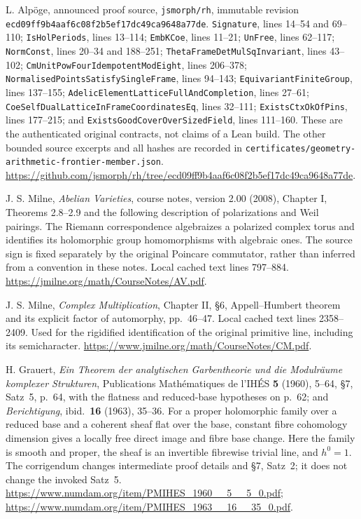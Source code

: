 L. Alp\"oge, announced proof source, \texttt{jsmorph/rh},
immutable revision \texttt{ecd09ff9b4aaf6c08f2b5ef17dc49ca9648a77de}.
\texttt{Signature}, lines 14--54 and 69--110;
\texttt{IsHolPeriods}, lines 13--114;
\texttt{EmbKCoe}, lines 11--21;
\texttt{UnFree}, lines 62--117;
\texttt{NormConst}, lines 20--34 and 188--251;
\texttt{ThetaFrameDetMulSqInvariant}, lines 43--102;
\texttt{CmUnitPowFourIdempotentModEight}, lines 206--378;
\texttt{NormalisedPointsSatisfySingleFrame}, lines 94--143;
\texttt{EquivariantFiniteGroup}, lines 137--155;
\texttt{AdelicElementLatticeFullAndCompletion}, lines 27--61;
\texttt{CoeSelfDualLatticeInFrameCoordinatesEq}, lines 32--111;
\texttt{ExistsCtxOkOfPins}, lines 177--215;
and \texttt{ExistsGoodCoverOverSizedField}, lines 111--160.
These are the authenticated original contracts, not claims of a
Lean build.  The other bounded source excerpts and all hashes
are recorded in
\texttt{certificates/geometry-arithmetic-frontier-member.json}.
\url{https://github.com/jsmorph/rh/tree/ecd09ff9b4aaf6c08f2b5ef17dc49ca9648a77de}.

J. S. Milne, \emph{Abelian Varieties}, course notes, version 2.00
(2008), Chapter I, Theorems 2.8--2.9 and the following description
of polarizations and Weil pairings.
The Riemann correspondence algebraizes a polarized complex torus
and identifies its holomorphic group homomorphisms with algebraic
ones.  The source sign is fixed separately by the original
Poincare commutator, rather than inferred from a convention in
these notes.
Local cached text lines 797--884.
\url{https://jmilne.org/math/CourseNotes/AV.pdf}.

J. S. Milne, \emph{Complex Multiplication}, Chapter II, \S6,
Appell--Humbert theorem and its explicit factor of automorphy,
pp.\ 46--47.
Local cached text lines 2358--2409.
Used for the rigidified identification of the original
primitive line, including its semicharacter.
\url{https://www.jmilne.org/math/CourseNotes/CM.pdf}.

H. Grauert, \emph{Ein Theorem der analytischen Garbentheorie
und die Modulr\"aume komplexer Strukturen},
Publications Math\'ematiques de l'IH\'ES \textbf{5} (1960), 5--64,
\S7, Satz~5, p.\ 64, with the flatness and reduced-base
hypotheses on p.\ 62; and \emph{Berichtigung},
ibid.\ \textbf{16} (1963), 35--36.
For a proper holomorphic family over a reduced base and a
coherent sheaf flat over the base, constant fibre cohomology
dimension gives a locally free direct image and fibre base
change.  Here the family is smooth and proper, the sheaf is an
invertible fibrewise trivial line, and $h^0=1$.  The corrigendum
changes intermediate proof details and \S7, Satz~2; it does
not change the invoked Satz~5.
\url{https://www.numdam.org/item/PMIHES_1960__5__5_0.pdf};
\url{https://www.numdam.org/item/PMIHES_1963__16__35_0.pdf}.

